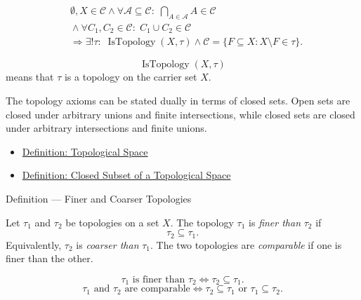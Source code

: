 \begin{remark*}
\[
\begin{aligned}
&\emptyset,X\in\mathcal{C}
\land
\forall \mathcal{A}\subseteq\mathcal{C}{:}\;
\bigcap_{A\in\mathcal{A}}A\in\mathcal{C}
\\
&{}\land
\forall C_1,C_2\in\mathcal{C}{:}\;
C_1\cup C_2\in\mathcal{C}
\\
&\Longrightarrow
\exists!\tau{:}\;
\operatorname{IsTopology}(X,\tau)
\land
\mathcal{C}
=
\{F\subseteq X:X\setminus F\in\tau\}.
\end{aligned}
\]
\end{remark*}

\begin{remark*}
\[
\operatorname{IsTopology}(X,\tau)
\]
means that \(\tau\) is a topology on the carrier set \(X\).
\end{remark*}

\begin{remark*}[Interpretation]
The topology axioms can be stated dually in terms of closed sets.  Open sets
are closed under arbitrary unions and finite intersections, while closed sets
are closed under arbitrary intersections and finite unions.
\end{remark*}

\begin{dependencies}
\begin{itemize}
  \item \hyperref[def:topological-space]{Definition: Topological Space}
  \item \hyperref[def:topological-closed-subset]{Definition: Closed Subset of a Topological Space}
\end{itemize}
\end{dependencies}

\begin{definitionbox}{Definition --- Finer and Coarser Topologies}
\begin{definition}
\label{def:finer-coarser-topologies}
Let \(\tau_1\) and \(\tau_2\) be topologies on a set \(X\).  The topology
\(\tau_1\) is \emph{finer than} \(\tau_2\) if
\[
  \tau_2\subseteq\tau_1.
\]
Equivalently, \(\tau_2\) is \emph{coarser than} \(\tau_1\).  The two
topologies are \emph{comparable} if one is finer than the other.
\end{definition}
\end{definitionbox}

\begin{remark*}
\[
\tau_1\text{ is finer than }\tau_2
\Longleftrightarrow
\tau_2\subseteq\tau_1.
\]
\[
\tau_1\text{ and }\tau_2\text{ are comparable}
\Longleftrightarrow
\tau_2\subseteq\tau_1
\text{ or }
\tau_1\subseteq\tau_2.
\]
\end{remark*}

